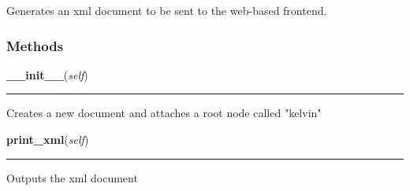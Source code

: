     \label{XMLGenerator:XMLGenerator}
Generates an xml document to be sent to the web-based frontend.



  \subsubsection{Methods}

    \label{XMLGenerator:XMLGenerator:__init__}

    \vspace{0.5ex}

\hspace{.8\funcindent}\begin{boxedminipage}{\funcwidth}

    \raggedright \textbf{\_\_init\_\_}(\textit{self})

    \vspace{-1.5ex}

    \rule{\textwidth}{0.5\fboxrule}
\setlength{\parskip}{2ex}
    Creates a new document and attaches a root node called "kelvin"

\setlength{\parskip}{1ex}
    \end{boxedminipage}

    \label{XMLGenerator:XMLGenerator:print_xml}

    \vspace{0.5ex}

\hspace{.8\funcindent}\begin{boxedminipage}{\funcwidth}

    \raggedright \textbf{print\_xml}(\textit{self})

    \vspace{-1.5ex}

    \rule{\textwidth}{0.5\fboxrule}
\setlength{\parskip}{2ex}
    Outputs the xml document

\setlength{\parskip}{1ex}
    \end{boxedminipage}

